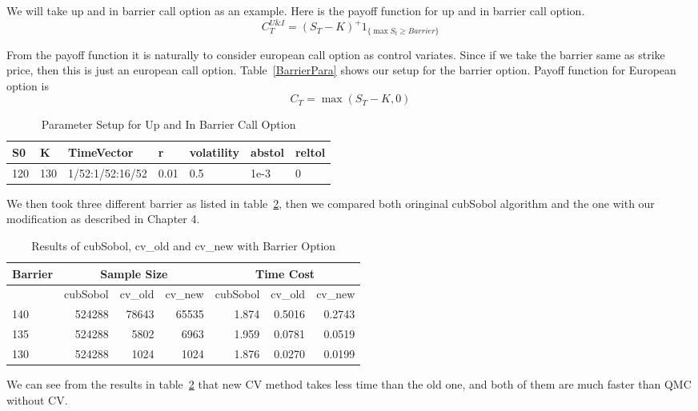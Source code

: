 
We will take up and in barrier call option as an example. Here is the payoff function for up and in barrier call option.
\[ C_{T}^{U\&I} = (S_T-K)^+1_{ \{\max S_t \geq Barrier\}} \]

From the payoff function it is naturally to consider european call option as control variates. Since if we take the barrier same as strike price, then this is just an european call option. Table~\ref{BarrierPara} shows our setup for the barrier option.
Payoff function for European option is
\[ C_{T} = \max (S_T-K,0)\]

\begin{table}[h]
\label{tb:BarrierPara}
    \caption{Parameter Setup for Up and In Barrier Call Option}
    \centering
	\begin{tabular}{lllllll}
        \hline\hline
        S0 & K & TimeVector & r & volatility & abstol & reltol \\[0.5ex]
        \hline
        120  & 130 & 1/52:1/52:16/52 & 0.01 & 0.5 & 1e-3 & 0\\[1ex]
        \hline
	\end{tabular}
\end{table}

We then took three different barrier as listed in table~\ref{tb:BarrierResults}, then we compared both oringinal cubSobol algorithm and the one with our modification as described in Chapter 4. 
\begin{table}[h]
    \centering
    \label{tb:BarrierResults}
	\caption{Results of cubSobol, cv\_old and cv\_new with Barrier Option}
    \begin{tabular}{lrrrrrr}
    \hline\hline
	Barrier &\multicolumn{3}{c}{Sample Size}
		&\multicolumn{3}{c}{Time Cost} \\
    \hline
	&cubSobol&cv\_old&cv\_new
    &cubSobol&cv\_old&cv\_new\\[0.5ex]
    \hline
	140  & 524288&78643& 65535
	     & 1.874& 0.5016&0.2743 \\ 
	135  & 524288& 5802&6963
	     & 1.959& 0.0781&0.0519 \\ 
	130  & 524288& 1024&1024
    & 1.876& 0.0270 & 0.0199 \\[1ex]
    \hline
	\end{tabular}
\end{table}
We can see from the results in table~\ref{tb:BarrierResults} that new CV method takes less time than the old one, and both of them are much faster than QMC without CV.
